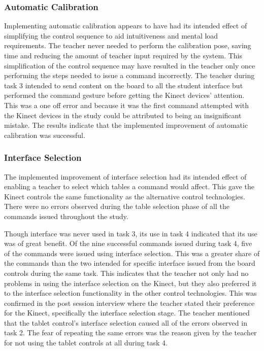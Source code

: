 \documentclass[manuscript, review, screen]{acmart}
\begin{document}
\subsubsection{Automatic Calibration}

Implementing automatic calibration appears to have had its intended effect of simplifying the control sequence to aid intuitiveness and mental load requirements.
The teacher never needed to perform the calibration pose, saving time and reducing the amount of teacher input required by the system.
This simplification of the control sequence may have resulted in the teacher only once performing the steps needed to issue a command incorrectly.
The teacher during task 3 intended to send content on the board to all the student interface but performed the command gesture before getting the Kinect devices' attention.
This was a one off error and because it was the first command attempted with the Kinect devices in the study could be attributed to being an insignificant mistake.
The results indicate that the implemented improvement of automatic calibration was successful.

\subsubsection{Interface Selection}

The implemented improvement of interface selection had its intended effect of enabling a teacher to select which tables a command would affect.
This gave the Kinect controls the same functionality as the alternative control technologies.
There were no errors observed during the table selection phase of all the commands issued throughout the study.

Though interface was never used in task 3, its use in task 4 indicated that its use was of great benefit.
Of the nine successful commands issued during task 4, five of the commands were issued using interface selection.
This was a greater share of the commands than the two intended for specific interface issued from the board controls during the same task.
This indicates that the teacher not only had no problems in using the interface selection on the Kinect, but they also preferred it to the interface selection functionality in the other control technologies.
This was confirmed in the post session interview where the teacher stated their preference for the Kinect, specifically the interface selection stage.
The teacher mentioned that the tablet control's interface selection caused all of the errors observed in task 2.
The fear of repeating the same errors was the reason given by the teacher for not using the tablet controls at all during task 4.
\end{document}
